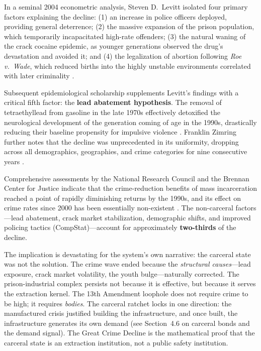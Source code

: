 \documentclass[12pt,openany]{book}
\begin{document}
In a seminal 2004 econometric analysis, Steven D.\ Levitt isolated four primary factors explaining the decline: (1) an increase in police officers deployed, providing general deterrence; (2) the massive expansion of the prison population, which temporarily incapacitated high-rate offenders; (3) the natural waning of the crack cocaine epidemic, as younger generations observed the drug's devastation and avoided it; and (4) the legalization of abortion following \textit{Roe v.\ Wade}, which reduced births into the highly unstable environments correlated with later criminality \cite{levitt2004}.

Subsequent epidemiological scholarship supplements Levitt's findings with a critical fifth factor: the \textbf{lead abatement hypothesis}. The removal of tetraethyllead from gasoline in the late 1970s effectively detoxified the neurological development of the generation coming of age in the 1990s, drastically reducing their baseline propensity for impulsive violence \cite{nevin2007, reyes2007}. Franklin Zimring further notes that the decline was unprecedented in its uniformity, dropping across all demographics, geographies, and crime categories for nine consecutive years \cite{zimring}.

Comprehensive assessments by the National Research Council and the Brennan Center for Justice indicate that the crime-reduction benefits of mass incarceration reached a point of rapidly diminishing returns by the 1990s, and its effect on crime rates since 2000 has been essentially non-existent \cite{brennan_decline}. The non-carceral factors---lead abatement, crack market stabilization, demographic shifts, and improved policing tactics (CompStat)---account for approximately \textbf{two-thirds} of the decline.

The implication is devastating for the system's own narrative: the carceral state was not the solution. The crime wave ended because the \textit{structural causes}---lead exposure, crack market volatility, the youth bulge---naturally corrected. The prison-industrial complex persists not because it is effective, but because it serves the extraction kernel. The 13th Amendment loophole does not require crime to be high; it requires \textit{bodies}. The carceral ratchet locks in one direction: the manufactured crisis justified building the infrastructure, and once built, the infrastructure generates its own demand (see Section~4.6 on carceral bonds and the demand signal). The Great Crime Decline is the mathematical proof that the carceral state is an extraction institution, not a public safety institution.
\end{document}
